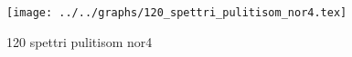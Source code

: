\begin{figure}[h] \centering\texttt{[image: ../../graphs/120\_spettri\_pulitisom\_nor4.tex]}\caption{120 spettri pulitisom nor4}\label{gr:120_spettri_pulitisom_nor4} \end{figure}

